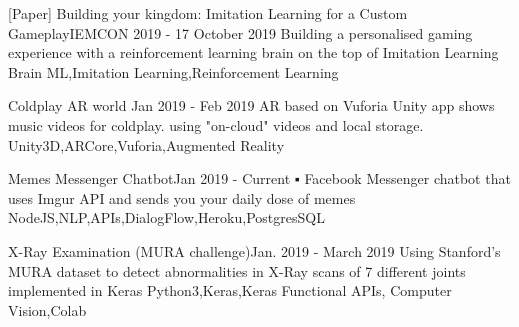 

\begin{projects}
	
		\project
	{[Paper] Building your kingdom: Imitation Learning for a Custom Gameplay}{IEMCON 2019 - 17 October 2019}
	{\paperSymbol{ }
	}
	{Building a personalised gaming experience with a reinforcement learning brain on the top of Imitation Learning Brain}
	{ML,Imitation Learning,Reinforcement Learning}
	
	
	\project
	{Coldplay AR world }{Jan 2019 - Feb 2019}
	{ 
	}
	{AR based on Vuforia Unity app shows music videos for coldplay. using "on-cloud" videos and local storage.}
	{Unity3D,ARCore,Vuforia,Augmented Reality}
	
		\project
	{Memes Messenger Chatbot}{Jan 2019 - Current}
	{ }
	{▪	Facebook Messenger chatbot that uses Imgur API and sends you your daily dose of memes }
	{NodeJS,NLP,APIs,DialogFlow,Heroku,PostgresSQL}
	
		\project
	{X-Ray Examination (MURA challenge)}{Jan. 2019 - March 2019}
	{}
	{Using Stanford's MURA dataset to detect abnormalities in X-Ray scans of 7 different joints
implemented in Keras}
	{Python3,Keras,Keras Functional APIs, Computer Vision,Colab}
			
\end{projects}